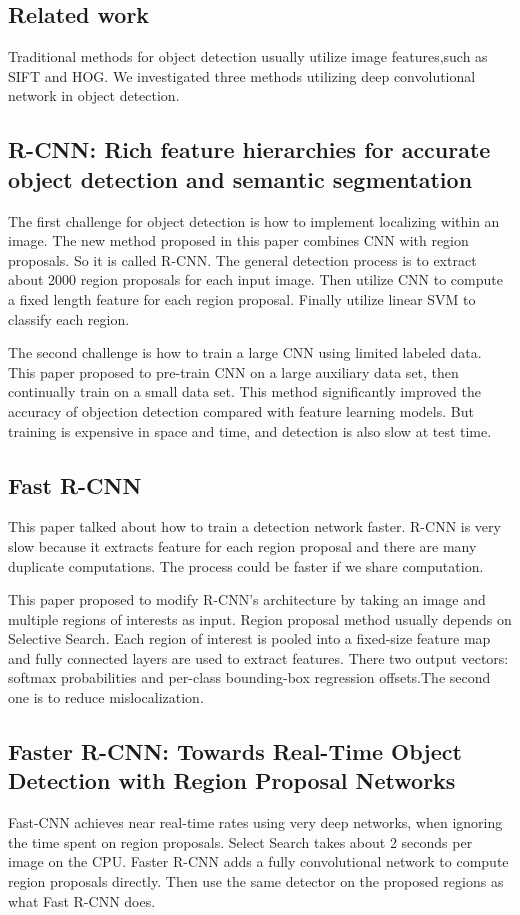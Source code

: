 
\subsection{Related work}
\label{others}
Traditional methods for object detection usually utilize image features,such as SIFT and HOG. We investigated three methods utilizing deep convolutional network in object detection.
\subsection{R-CNN: Rich feature hierarchies for accurate object detection and semantic segmentation}

 The first challenge for object detection is how to implement localizing within an image. The new method proposed in this paper\cite {rcnn} combines CNN with region proposals. So it is called R-CNN. The general detection process is to extract about 2000 region proposals for each input image. Then utilize CNN to compute a fixed length feature for each region proposal. Finally utilize linear SVM to classify each region. 


The second challenge is how to train a large CNN using limited labeled data. This paper proposed to pre-train CNN on a large auxiliary data set, then continually train on a small data set. This method significantly improved the accuracy of objection detection compared with feature learning models. But training is expensive in space and time, and detection is also slow at test time.

\subsection{Fast R-CNN}
This paper\cite {fast-rcnn} talked about how to train a detection network faster. R-CNN is very slow because it extracts feature for each region proposal and there are many duplicate computations. The process could be faster if we share computation. 

This paper proposed to modify R-CNN’s architecture by taking an image and multiple regions of interests as input. Region proposal method usually depends on Selective Search. Each region of interest is pooled into a fixed-size feature map and fully connected layers are used to extract features. There two output vectors: softmax probabilities and per-class bounding-box regression offsets.The second one is to reduce mislocalization.

\subsection{Faster R-CNN: Towards Real-Time Object Detection with Region Proposal Networks}
Fast-CNN achieves near real-time rates using very deep networks, when ignoring the time spent on region proposals. Select Search takes about 2 seconds per image on the CPU. Faster R-CNN\cite {faster-rcnn} adds a fully convolutional network to compute region proposals directly. Then use the same detector on the proposed regions as what Fast R-CNN does. 




